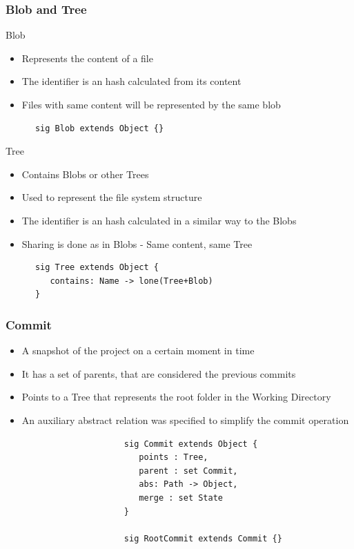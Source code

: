 \documentclass{beamer}
\begin{document}
\begin{frame}[fragile]
   \frametitle{Blob and Tree}
   \begin{block}{Blob}
      \begin{itemize}
         \item Represents the content of a file
         \item The identifier is an hash calculated from its content
         \item Files with same content will be represented by the same blob
      \end{itemize}
      \tiny
      \color{blue}
      \begin{lstlisting}
      sig Blob extends Object {}
      \end{lstlisting}
   \end{block}
   \begin{block}{Tree}
      \begin{itemize}
         \item Contains Blobs or other Trees 
         \item Used to represent the file system structure
	      \item The identifier is an hash calculated in a similar way to the Blobs
         \item Sharing is done as in Blobs - Same content, same Tree
      \end{itemize}
      \tiny
      \color{blue}
      \begin{lstlisting}
      sig Tree extends Object {
         contains: Name -> lone(Tree+Blob)
      }
      \end{lstlisting}
   \end{block}
\end{frame}

\begin{frame}[fragile]
   \frametitle{Commit}
   \begin{itemize}
      \item A snapshot of the project on a certain moment
      in time
      \item It has a set of parents, that are considered the previous commits 
	   \item Points to a Tree that represents the root folder in the
	Working Directory
      \item An auxiliary abstract relation was specified
   to simplify the commit operation
   \end{itemize}
   \tiny
   \color{blue}
   \begin{lstlisting}
                        sig Commit extends Object {
                           points : Tree,
                           parent : set Commit,
                           abs: Path -> Object,
                           merge : set State
                        }
                           
                        sig RootCommit extends Commit {}
\end{lstlisting}
\end{frame}
\end{document}
